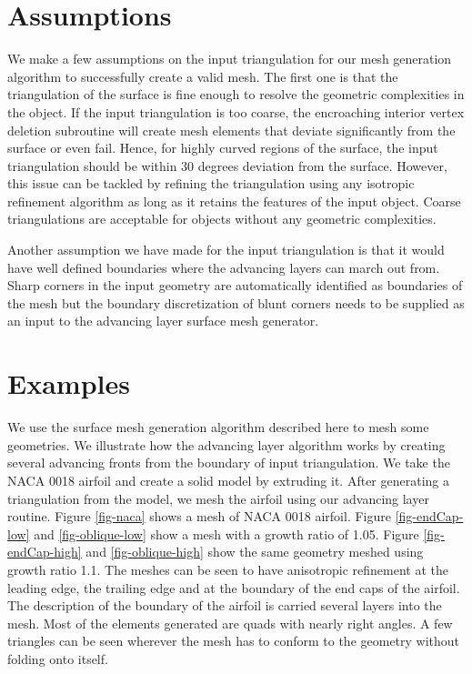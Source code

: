 \documentclass[conf]{new-aiaa}
\begin{document}
\section{Assumptions}

We make a few assumptions on the input triangulation for our mesh generation algorithm to successfully create a valid mesh. The first one is that the triangulation of the surface is fine enough to resolve the geometric complexities in the object. If the input triangulation is too coarse, the encroaching interior vertex deletion subroutine will create mesh elements that deviate significantly from the surface or even fail. Hence, for highly curved regions of the surface, the input triangulation should be within 30 degrees deviation from the surface. However, this issue can be tackled by refining the triangulation using any isotropic refinement algorithm as long as it retains the features of the input object. Coarse triangulations are acceptable for objects without any geometric complexities.

Another assumption we have made for the input triangulation is that it would have well defined boundaries where the advancing layers can march out from. Sharp corners in the input geometry are automatically identified as boundaries of the mesh but the boundary discretization of blunt corners needs to be supplied as an input to the advancing layer surface mesh generator.

\section{Examples}

We use the surface mesh generation algorithm described here to mesh some geometries. We illustrate how the advancing layer algorithm works by creating several advancing fronts from the boundary of input triangulation. We take the NACA 0018 airfoil and create a solid model by extruding it. After generating a triangulation from the model, we mesh the airfoil using our advancing layer routine. Figure \ref{fig-naca} shows a mesh of NACA 0018 airfoil. Figure \ref{fig-endCap-low} and \ref{fig-oblique-low} show a mesh with a growth ratio of 1.05. Figure \ref{fig-endCap-high} and \ref{fig-oblique-high} show the same geometry meshed using growth ratio 1.1. The meshes can be seen to have anisotropic refinement at the leading edge, the trailing edge and at the boundary of the end caps of the airfoil. The description of the boundary of the airfoil is carried several layers into the mesh. Most of the elements generated are quads with nearly right angles. A few triangles can be seen wherever the mesh has to conform to the geometry without folding onto itself. 
\end{document}
